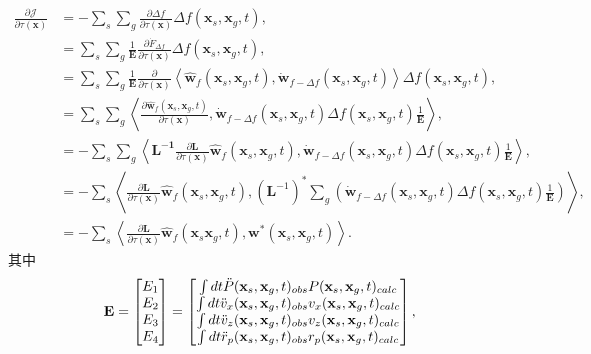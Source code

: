 \begin{equation}
	\begin{aligned}
		\frac{\partial \mathcal{J}}{\partial \tau(\mathbf{x})} &= -\sum_s \sum_g 
		\frac{\partial \Delta f}{\partial \tau(\mathbf{x})}
		\Delta f(\mathbf{x}_s,\mathbf{x}_g,t), \\
		&=\sum_s \sum_g \frac{1}{\mathbf{E}}\frac{\partial \dot{F}_{\Delta f}}
		{\partial \tau(\mathbf{x})} \Delta f(\mathbf{x}_s,\mathbf{x}_g,t), \\
		&= \sum_s \sum_g \frac{1}{\mathbf{E}}\frac{\partial}{\partial \tau(\mathbf{x})}
		\left\langle \hat{\mathbf{w}}_f(\mathbf{x}_s,\mathbf{x}_g,t), 
		\dot{\mathbf{w}}_{f-\Delta f}(\mathbf{x}_s,\mathbf{x}_g,t) \right\rangle 
		\Delta f(\mathbf{x}_s,\mathbf{x}_g,t), \\
		&= \sum_s \sum_g\left\langle \frac{\partial \hat{\mathbf{w}}_f(\mathbf{x}_s,\mathbf{x}_g,t)}
		{\partial \tau(\mathbf{x})},\dot{\mathbf{w}}_{f-\Delta f}(\mathbf{x}_s,\mathbf{x}_g,t)
		\Delta f(\mathbf{x}_s,\mathbf{x}_g,t)\frac{1}{\mathbf{E}}\right\rangle, \\
		&= -\sum_s \sum_g\left\langle \mathbf{L^{-1}}\frac{\partial \mathbf{L}}{\partial \tau(\mathbf{x})}
		\hat{\mathbf{w}}_f(\mathbf{x}_s,\mathbf{x}_g,t),\dot{\mathbf{w}}_{f-\Delta f}(
		\mathbf{x}_s,\mathbf{x}_g,t)\Delta f(\mathbf{x}_s,\mathbf{x}_g,t)\frac{1}{\mathbf{E}}\right\rangle, \\
		&=-\sum_s\left\langle\frac{\partial \mathbf{L}}{\partial \tau(\mathbf{x})}
		\hat{\mathbf{w}}_f(\mathbf{x}_s,\mathbf{x}_g,t),(\mathbf{L}^{-1})^\ast\sum_g
		\left(\dot{\mathbf{w}}_{f-\Delta f}(\mathbf{x}_s,\mathbf{x}_g,t)
		\Delta f(\mathbf{x}_s,\mathbf{x}_g,t)\frac{1}{\mathbf{E}}\right)\right\rangle, \\
		&=-\sum_s\left\langle \frac{\partial \mathbf{L}}{\partial \tau(\mathbf{x})}
		\hat{\mathbf{w}}_f(\mathbf{x}_s\mathbf{x}_g,t),
		\mathbf{w}^\ast(\mathbf{x}_s,\mathbf{x}_g,t)\right\rangle.
	\end{aligned}
	\label{eq:ad_algrithm}
\end{equation}
其中
\begin{equation}
	\mathbf{E}=\begin{bmatrix} E_1 \cr E_2 \cr E_3 \cr E_4 \end{bmatrix}
		=\begin{bmatrix} \int dt \ddot{P}(\mathbf{x}_s,\mathbf{x}_g,t)_{obs}
		P(\mathbf{x}_s,\mathbf{x}_g,t)_{calc} \cr 
	\int dt \ddot{v}_x(\mathbf{x}_s,\mathbf{x}_g,t)_{obs}v_x(\mathbf{x}_s,\mathbf{x}_g,t)_{calc} \cr 
	\int dt \ddot{v}_z(\mathbf{x}_s,\mathbf{x}_g,t)_{obs}v_z(\mathbf{x}_s,\mathbf{x}_g,t)_{calc} \cr 
	\int dt \ddot{r}_p(\mathbf{x}_s,\mathbf{x}_g,t)_{obs}r_p(\mathbf{x}_s,\mathbf{x}_g,t)_{calc} 
		\end{bmatrix},
\end{equation}

